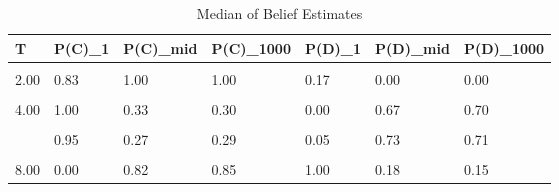 \begin{table}[!h]
\centering
\caption{Median of Belief Estimates}
\centering
\begin{tabular}[t]{lllllll}
\toprule
T & P(C)\_1 & P(C)\_mid & P(C)\_1000 & P(D)\_1 & P(D)\_mid & P(D)\_1000\\
\midrule
\cellcolor{gray!10}{1.00} & \cellcolor{gray!10}{1.00} & \cellcolor{gray!10}{1.00} & \cellcolor{gray!10}{1.00} & \cellcolor{gray!10}{0.00} & \cellcolor{gray!10}{0.00} & \cellcolor{gray!10}{0.00}\\
2.00 & 0.83 & 1.00 & 1.00 & 0.17 & 0.00 & 0.00\\
\cellcolor{gray!10}{3.00} & \cellcolor{gray!10}{0.97} & \cellcolor{gray!10}{0.04} & \cellcolor{gray!10}{0.07} & \cellcolor{gray!10}{0.03} & \cellcolor{gray!10}{0.96} & \cellcolor{gray!10}{0.93}\\
4.00 & 1.00 & 0.33 & 0.30 & 0.00 & 0.67 & 0.70\\
\cellcolor{gray!10}{5.00} & \cellcolor{gray!10}{0.99} & \cellcolor{gray!10}{0.32} & \cellcolor{gray!10}{0.30} & \cellcolor{gray!10}{0.01} & \cellcolor{gray!10}{0.68} & \cellcolor{gray!10}{0.70}\\
\addlinespace
6.00 & 0.95 & 0.27 & 0.29 & 0.05 & 0.73 & 0.71\\
\cellcolor{gray!10}{7.00} & \cellcolor{gray!10}{0.00} & \cellcolor{gray!10}{0.76} & \cellcolor{gray!10}{0.87} & \cellcolor{gray!10}{1.00} & \cellcolor{gray!10}{0.24} & \cellcolor{gray!10}{0.13}\\
8.00 & 0.00 & 0.82 & 0.85 & 1.00 & 0.18 & 0.15\\
\bottomrule
\end{tabular}
\end{table}